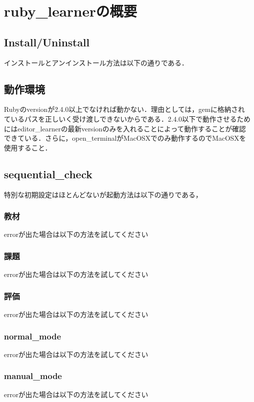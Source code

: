 \chapter{ruby\_learnerの概要}
\section{Install/Uninstall}\label{install/uninstall}
インストールとアンインストール方法は以下の通りである．

\section{動作環境}\label{operating_environment}
Rubyのversionが2.4.0以上でなければ動かない．理由としては，gemに格納されているパスを正しいく受け渡しできないからである．2.4.0以下で動作させるためにはeditor\_learnerの最新versionのみを入れることによって動作することが確認できている．さらに，open\_terminalがMacOSXでのみ動作するのでMacOSXを使用すること．

\section{sequential\_check}\label{sequential_check}
特別な初期設定はほとんどないが起動方法は以下の通りである，

\subsection{教材}\label{text}
errorが出た場合は以下の方法を試してください

\subsection{課題}\label{question}
errorが出た場合は以下の方法を試してください

\subsection{評価}\label{evaluation}
errorが出た場合は以下の方法を試してください

\subsection{normal\_mode}\label{nomal_mode}
errorが出た場合は以下の方法を試してください

\subsection{manual\_mode}\label{manual_mode}
errorが出た場合は以下の方法を試してください

